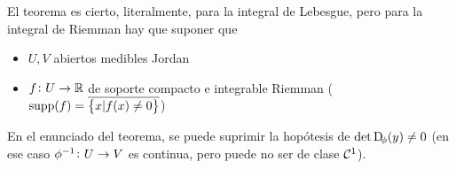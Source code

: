 \begin{obs}
    El teorema es cierto, literalmente, para la integral de Lebesgue, pero para la integral de Riemman hay que suponer que
    \begin{itemize}
        \item $U,V$ abiertos medibles Jordan
        \item $f \colon U \to \mathbb{R}$ de soporte compacto e integrable Riemman ($\text{supp}(f) = \overline{\left\{x \vert f(x) \neq 0\right\}}$)
    \end{itemize}
\end{obs}

\begin{obs}
    En el enunciado del teorema, se puede suprimir la hopótesis de $\det \Dif_\phi(y) \neq 0$ (en ese caso $\phi^{-1} \colon U \to V$ es
    continua, pero puede no ser de clase $\mathcal{C}^1$).
\end{obs}


